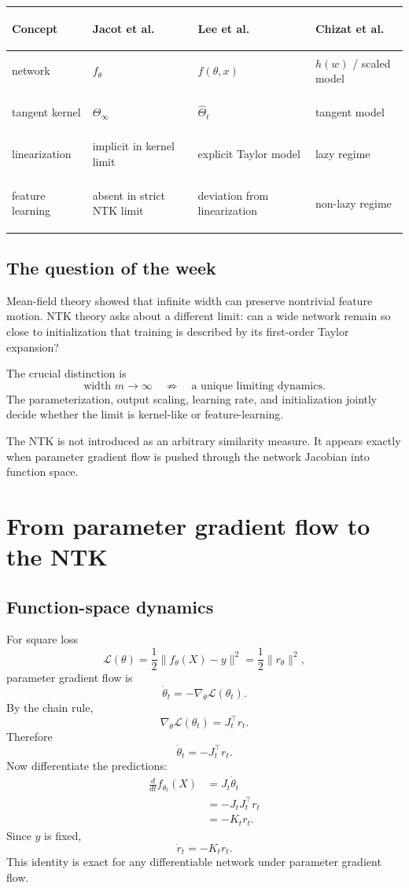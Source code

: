 \documentclass[11pt,a4paper,oneside,openany]{memoir}
\theoremstyle{definition}
\begin{document}
\begin{center}\small
\begin{tabularx}{\textwidth}{>{\bfseries\raggedright\arraybackslash}p{}XXX}
\toprule
Concept & Jacot et al. & Lee et al. & Chizat et al.\\
\midrule
network & $f_\theta$ & $f(\theta,x)$ & $h(w)$ / scaled model\\
tangent kernel & $\Theta_\infty$ & $\hat\Theta_t$ & tangent model\\
linearization & implicit in kernel limit & explicit Taylor model & lazy regime\\
feature learning & absent in strict NTK limit & deviation from linearization & non-lazy regime\\
\bottomrule
\end{tabularx}
\end{center}

\section{The question of the week}
Mean-field theory showed that infinite width can preserve nontrivial feature motion.  NTK theory asks about a different limit: can a wide network remain so close to initialization that training is described by its first-order Taylor expansion?

The crucial distinction is
\[
\text{width }m\to\infty
\quad\not\Rightarrow\quad
\text{a unique limiting dynamics}.
\]
The parameterization, output scaling, learning rate, and initialization jointly decide whether the limit is kernel-like or feature-learning.

\begin{presentbox}
The NTK is not introduced as an arbitrary similarity measure.  It appears exactly when parameter gradient flow is pushed through the network Jacobian into function space.
\end{presentbox}

\chapter{From parameter gradient flow to the NTK}
\section{Function-space dynamics}
For square loss
\[
\mathcal L(\theta)=\frac12\|f_\theta(X)-y\|^2=\frac12\|r_\theta\|^2,
\]
parameter gradient flow is
\[
\dot\theta_t=-\nabla_\theta\mathcal L(\theta_t).
\]
By the chain rule,
\[
\nabla_\theta\mathcal L(\theta_t)=J_t^\top r_t.
\]
Therefore
\[
\dot\theta_t=-J_t^\top r_t.
\]
Now differentiate the predictions:
\begin{align*}
\frac{d}{dt}f_{\theta_t}(X)
&=J_t\dot\theta_t\\
&=-J_tJ_t^\top r_t\\
&=-K_t r_t.
\end{align*}
Since $y$ is fixed,
\[
\boxed{\dot r_t=-K_t r_t.}
\]
This identity is exact for any differentiable network under parameter gradient flow.
\end{document}
